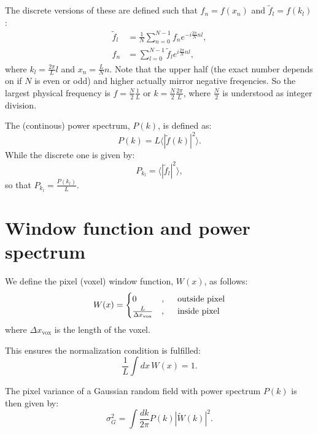 \documentclass[a4paper,10pt]{article}
\begin{document}
The discrete versions of these are defined such that $f_n = f(x_n)$ and $\tilde{f}_l = f(k_l)$:
\begin{align}
\tilde{f}_l &= \frac{1}{N} \sum_{n=0}^{N-1} f_n e^{-i\frac{2 \pi}{N} n l}, \\
f_n &= \sum_{l=0}^{N-1} \tilde{f}_l e^{i\frac{2 \pi}{N} n l},
\end{align}
where $ k_l = \frac{2 \pi}{L} l$ and $ x_n = \frac{L}{N} n$. Note that the upper half (the exact number depends on if $N$ is even or odd) and higher actually mirror negative freqencies. So the largest physical frequency is $f = \frac{N}{2} \frac{1}{L}$ or $k = \frac{N}{2} \frac{2\pi}{L}$, where $\frac{N}{2}$ is understood as integer division.

The (continous) power spectrum, $P(k)$, is defined as:
\begin{equation}
 P(k) = L \langle |\tilde{f}(k)|^2 \rangle.
\end{equation}
While the discrete one is given by: 
\begin{equation}
 P_{k_l} = \langle |\tilde{f}_l|^2 \rangle, 
\end{equation}
so that $P_{k_l}  = \frac{P(k_l)}{L}$.

\section{Window function and power spectrum}
We define the pixel (voxel) window function, $W(x)$, as follows:
\begin{equation}
 W(x) = \begin{cases} 
      0 &, \hspace{0.5cm}\text{outside pixel} \\   \frac{L}{\Delta x_\text{vox}} &, \hspace{0.5cm}   \text{inside pixel} 
   \end{cases}
\end{equation}
where $\Delta x_\text{vox}$ is the length of the voxel. 

This ensures the normalization condition is fulfilled:
\begin{equation}
 \frac{1}{L} \int  dx \, W(x)= 1.
\end{equation}

The pixel variance of a Gaussian random field with power spectrum $P(k)$ is then given by:
\begin{equation}
 \sigma_G^2 = \int \frac{dk}{2\pi} P(k) |\tilde{W}(k)|^2 .
\end{equation}
\end{document}
